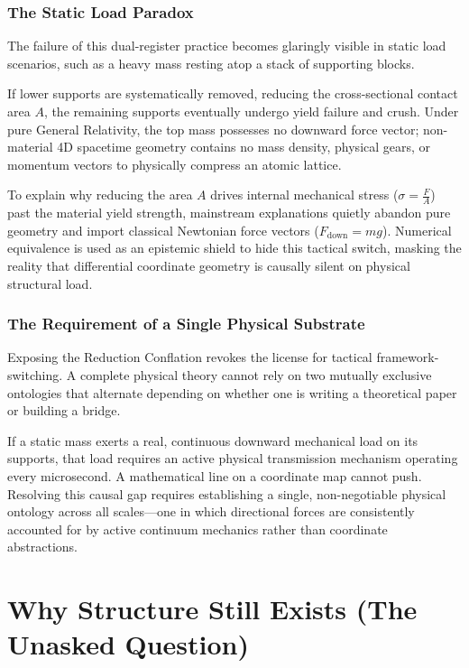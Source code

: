 \documentclass[12pt, a4paper]{article}
\begin{document}
\subsubsection{The Static Load Paradox}

The failure of this dual-register practice becomes glaringly visible in static load scenarios, such as a heavy mass resting atop a stack of supporting blocks.

If lower supports are systematically removed, reducing the cross-sectional contact area $A$, the remaining supports eventually undergo yield failure and crush. Under pure General Relativity, the top mass possesses no downward force vector; non-material 4D spacetime geometry contains no mass density, physical gears, or momentum vectors to physically compress an atomic lattice.

To explain why reducing the area $A$ drives internal mechanical stress ($\sigma = \frac{F}{A}$) past the material yield strength, mainstream explanations quietly abandon pure geometry and import classical Newtonian force vectors ($F_{\text{down}} = mg$). Numerical equivalence is used as an epistemic shield to hide this tactical switch, masking the reality that differential coordinate geometry is causally silent on physical structural load.

\subsubsection{The Requirement of a Single Physical Substrate}

Exposing the Reduction Conflation revokes the license for tactical framework-switching. A complete physical theory cannot rely on two mutually exclusive ontologies that alternate depending on whether one is writing a theoretical paper or building a bridge. 

If a static mass exerts a real, continuous downward mechanical load on its supports, that load requires an active physical transmission mechanism operating every microsecond. A mathematical line on a coordinate map cannot push. Resolving this causal gap requires establishing a single, non-negotiable physical ontology across all scales—one in which directional forces are consistently accounted for by active continuum mechanics rather than coordinate abstractions.
\section{Why Structure Still Exists (The Unasked Question)}
\label{sec:structure}
\end{document}
